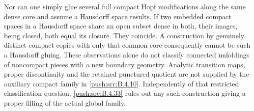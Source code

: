 Nor can one simply glue several full compact Hopf modifications
along the same dense core and assume a Hausdorff space results.
If two embedded compact spaces in a Hausdorff space share an open
subset dense in both, their images, being closed, both equal its
closure. They coincide. A construction by genuinely distinct
compact copies with only that common core consequently cannot be
such a Hausdorff gluing.
These observations alone do not classify connected unfoldings
of noncompact pieces with a new boundary geometry. Analytic
transition maps, proper discontinuity and the retained punctured
quotient are not supplied by the auxiliary compact family in
\ref{push:src:B.4.10}. Independently of that restricted classification question,
\ref{push:src:B.4.33} rules out any such construction giving a proper filling
of the actual global family.




